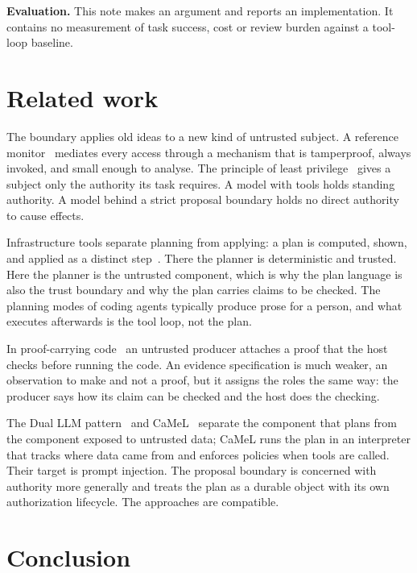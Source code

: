 \documentclass[10pt,letterpaper]{article}
\newcommand{\run}[1]{\textbf{#1}\hspace{0.45em}}
\begin{document}
\run{Evaluation.} This note makes an argument and reports an implementation. It contains no
measurement of task success, cost or review burden against a tool-loop baseline.

\section{Related work}

The boundary applies old ideas to a new kind of untrusted subject. A reference
monitor~\cite{anderson72} mediates every access through a mechanism that is tamperproof,
always invoked, and small enough to analyse. The principle of least
privilege~\cite{saltzer75} gives a subject only the authority its task requires. A model with
tools holds standing authority. A model behind a strict proposal boundary holds no direct
authority to cause effects.

Infrastructure tools separate planning from applying: a plan is computed, shown, and applied
as a distinct step~\cite{terraform}. There the planner is deterministic and trusted. Here the
planner is the untrusted component, which is why the plan language is also the trust boundary
and why the plan carries claims to be checked. The planning modes of coding agents typically
produce prose for a person, and what executes afterwards is the tool loop, not the plan.

In proof-carrying code~\cite{necula97} an untrusted producer attaches a proof that the host
checks before running the code. An evidence specification is much weaker, an observation to
make and not a proof, but it assigns the roles the same way: the producer says how its claim
can be checked and the host does the checking.

The Dual LLM pattern~\cite{willison23} and CaMeL~\cite{debenedetti25} separate the component
that plans from the component exposed to untrusted data; CaMeL runs the plan in an interpreter
that tracks where data came from and enforces policies when tools are called. Their target is
prompt injection. The proposal boundary is concerned with authority more generally and treats
the plan as a durable object with its own authorization lifecycle. The approaches are
compatible.

\section{Conclusion}
\end{document}
